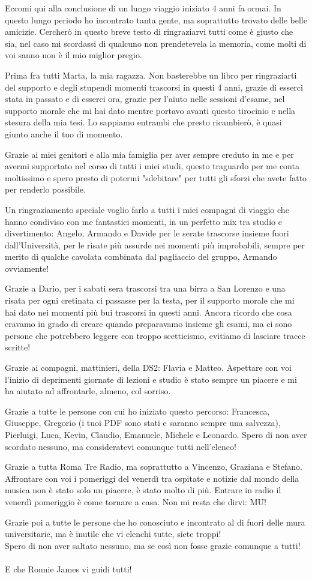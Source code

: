 Eccomi qui alla conclusione di un lungo viaggio iniziato 4 anni fa ormai. In questo lungo periodo ho incontrato tanta gente, ma soprattutto trovato delle belle amicizie. Cercherò in questo breve testo di ringraziarvi tutti come è giusto che sia, nel caso mi scordassi di qualcuno non prendetevela la memoria, come molti di voi sanno non è il mio miglior pregio.

Prima fra tutti Marta, la mia ragazza. Non basterebbe un libro per ringraziarti del supporto e degli stupendi momenti trascorsi in questi 4 anni, grazie di esserci stata in passato e di esserci ora, grazie per l'aiuto nelle sessioni d'esame, nel supporto morale che mi hai dato mentre portavo avanti questo tirocinio e nella stesura della mia tesi. Lo sappiamo entrambi che presto ricambierò, è quasi giunto anche il tuo di momento.

Grazie ai miei genitori e alla mia famiglia per aver sempre creduto in me e per avermi supportato nel corso di tutti i miei studi, questo traguardo per me conta moltissimo e spero presto di potermi "sdebitare" per tutti gli sforzi che avete fatto per renderlo possibile.

Un ringraziamento speciale voglio farlo a tutti i miei compagni di viaggio che hanno condiviso con me fantastici momenti, in un perfetto mix tra studio e divertimento: Angelo, Armando e Davide per le serate trascorse insieme fuori dall'Università, per le risate più assurde nei momenti più improbabili, sempre per merito di qualche cavolata combinata dal pagliaccio del gruppo, Armando ovviamente! 

Grazie a Dario, per i sabati sera trascorsi tra una birra a San Lorenzo e una risata per ogni cretinata ci passasse per la testa, per il supporto morale che mi hai dato nei momenti più bui trascorsi in questi anni. Ancora ricordo che cosa eravamo in grado di creare quando preparavamo insieme gli esami, ma ci sono persone che potrebbero leggere con troppo scetticismo, evitiamo di lasciare tracce scritte!

Grazie ai compagni, mattinieri, della DS2: Flavia e Matteo. Aspettare con voi l'inizio di deprimenti giornate di lezioni e studio è stato sempre un piacere e mi ha aiutato ad affrontarle, almeno, col sorriso.

Grazie a tutte le persone con cui ho iniziato questo percorso: Francesca, Giuseppe, Gregorio (i tuoi PDF sono stati e saranno sempre una salvezza), Pierluigi, Luca, Kevin, Claudio, Emanuele, Michele e Leonardo. Spero di non aver scordato nessuno, ma consideratevi comunque tutti nell'elenco!

Grazie a tutta Roma Tre Radio, ma soprattutto a Vincenzo, Graziana e Stefano. Affrontare con voi i pomeriggi del venerdì tra ospitate e notizie dal mondo della musica non è stato solo un piacere, è stato molto di più. Entrare in radio il venerdì pomeriggio è come tornare a casa. Non mi resta che dirvi: MU! 

Grazie poi a tutte le persone che ho conosciuto e incontrato al di fuori delle mura universitarie, ma è inutile che vi elenchi tutte, siete troppi!\\Spero di non aver saltato nessuno, ma se così non fosse grazie comunque a tutti!\\\\E che Ronnie James vi guidi tutti!
